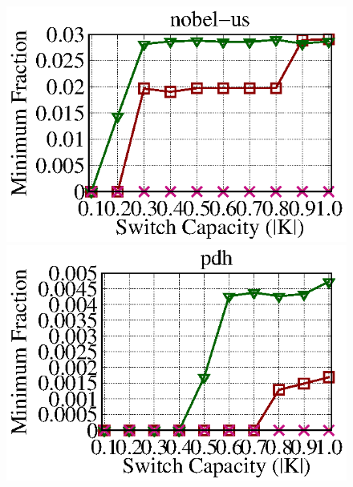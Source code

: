 \documentclass[a4paper,12pt]{report}
\begin{document}
\begin{large}
\begin{figure}[ht]
	  \includegraphics[width=1.0\textwidth]{nobel-us_geni_lambda_e05.eps}
	  \includegraphics[width=1.0\textwidth]{pdh_geni_lambda_e05.eps}
  \end{figure}
  
  
  

\end{large}
\end{document}
